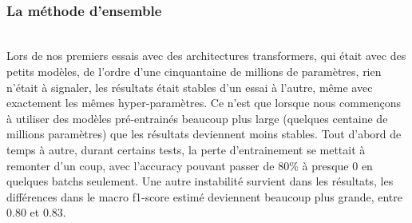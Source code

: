 \hfill\\
\subsubsection{La méthode d'ensemble}
\hfill\\

Lors de nos premiers essais avec des architectures transformers, qui était avec des petits modèles, de l'ordre d'une cinquantaine de millions de paramètres, rien n'était à signaler, les résultats était stables d'un essai à l'autre, même avec exactement les mêmes hyper-paramètres. Ce n'est que lorsque nous commençons à utiliser des modèles pré-entrainés beaucoup plus large (quelques centaine de millions paramètres) que les résultats deviennent moins stables. Tout d'abord de temps à autre, durant certains tests, la perte d'entrainement se mettait à remonter d'un coup, avec l'accuracy pouvant passer de 80\% à presque 0 en quelques batchs seulement. Une autre instabilité survient dans les résultats, les différences dans le macro f1-score estimé deviennent beaucoup plus grande, entre 0.80 et 0.83. \\

